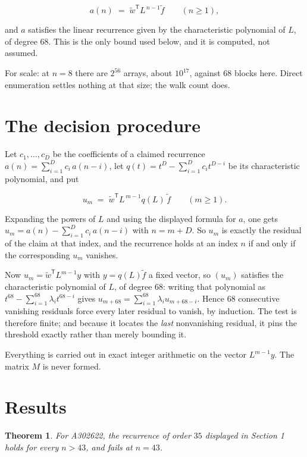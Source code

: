 \documentclass[11pt]{article}
\newtheorem{theorem}{Theorem}
\theoremstyle{definition}
\begin{document}
\[a(n) \;=\; \tilde w^{\mathsf T} L^{\,n-1} \tilde f \qquad (n \ge 1),\]

and $a$ satisfies the linear recurrence given by the characteristic polynomial of $L$, of degree $68$. This is the only bound used below, and it is computed, not assumed.

For scale: at $n = 8$ there are $2^{56}$ arrays, about $10^{17}$, against $68$ blocks here. Direct enumeration settles nothing at that size; the walk count does.

\section{The decision procedure}

Let $c_1,\dots,c_D$ be the coefficients of a claimed recurrence $a(n) = \sum_{i=1}^{D} c_i\,a(n-i)$, let $q(t) = t^{D} - \sum_{i=1}^{D} c_i t^{D-i}$ be its characteristic polynomial, and put

\[u_m \;=\; \tilde w^{\mathsf T} L^{\,m-1} q(L)\,\tilde f \qquad (m \ge 1).\]

Expanding the powers of $L$ and using the displayed formula for $a$, one gets $u_m = a(n) - \sum_{i=1}^{D} c_i\,a(n-i)$ with $n = m + D$. So $u_m$ is exactly the residual of the claim at that index, and the recurrence holds at an index $n$ if and only if the corresponding $u_m$ vanishes.

Now $u_m = \tilde w^{\mathsf T} L^{m-1} y$ with $y = q(L)\tilde f$ a fixed vector, so $(u_m)$ satisfies the characteristic polynomial of $L$, of degree $68$: writing that polynomial as $t^{68} - \sum_{i=1}^{68} \lambda_i t^{68-i}$ gives $u_{m+68} = \sum_{i=1}^{68} \lambda_i u_{m+68-i}$. Hence $68$ consecutive vanishing residuals force every later residual to vanish, by induction. The test is therefore finite; and because it locates the {\itshape last} nonvanishing residual, it pins the threshold exactly rather than merely bounding it.

Everything is carried out in exact integer arithmetic on the vector $L^{m-1}y$. The matrix $M$ is never formed.

\section{Results}

\begin{theorem} For A302622, the recurrence of order $35$ displayed in Section 1 holds for every $n > 43$, and fails at $n = 43$.\end{theorem}
\end{document}
